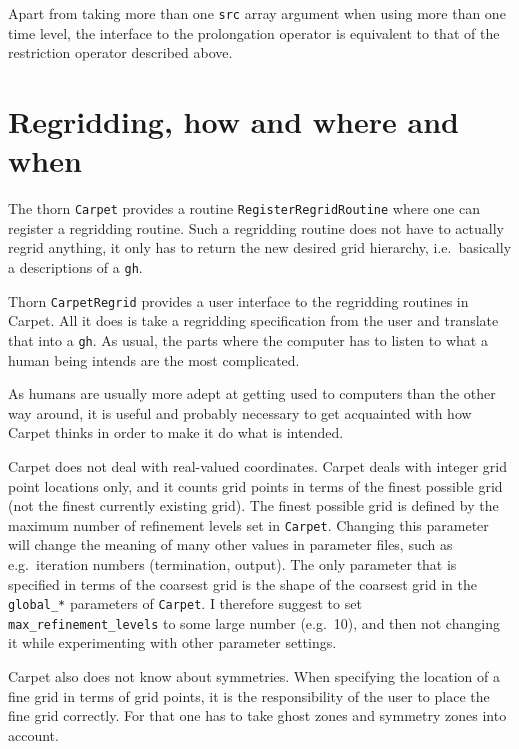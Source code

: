 \documentclass{article}
\begin{document}
   Apart from taking more than one \texttt{src} array argument when
   using more than one time level, the interface to the prolongation
   operator is equivalent to that of the restriction operator
   described above.



\section{Regridding, how and where and when}

   The thorn \texttt{Carpet} provides a routine
   \texttt{RegisterRegridRoutine} where one can register a regridding
   routine.  Such a regridding routine does not have to actually
   regrid anything, it only has to return the new desired grid
   hierarchy, i.e.\ basically a descriptions of a \texttt{gh}.

   Thorn \texttt{CarpetRegrid} provides a user interface to the
   regridding routines in Carpet.  All it does is take a regridding
   specification from the user and translate that into a \texttt{gh}.
   As usual, the parts where the computer has to listen to what a
   human being intends are the most complicated.

   As humans are usually more adept at getting used to computers than
   the other way around, it is useful and probably necessary to get
   acquainted with how Carpet thinks in order to make it do what is
   intended.

   Carpet does not deal with real-valued coordinates.  Carpet deals
   with integer grid point locations only, and it counts grid points
   in terms of the finest possible grid (not the finest currently
   existing grid).  The finest possible grid is defined by the maximum
   number of refinement levels set in \texttt{Carpet}.  Changing this
   parameter will change the meaning of many other values in parameter
   files, such as e.g.\ iteration numbers (termination, output).  The
   only parameter that is specified in terms of the coarsest grid is
   the shape of the coarsest grid in the \texttt{global\_*} parameters
   of \texttt{Carpet}.  I therefore suggest to set
   \texttt{max\_refinement\_levels} to some large number (e.g.\ 10),
   and then not changing it while experimenting with other parameter
   settings.

   Carpet also does not know about symmetries.  When specifying the
   location of a fine grid in terms of grid points, it is the
   responsibility of the user to place the fine grid correctly.  For
   that one has to take ghost zones and symmetry zones into account.
\end{document}
